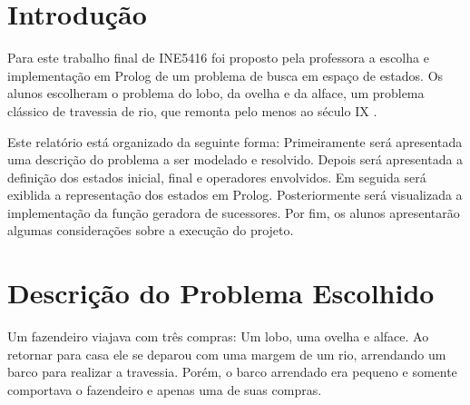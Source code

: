 \documentclass[brazil,times]{abnt}
\begin{document}





\data{\today}

\capa

\folhaderosto

\section*{Introdução}
	Para este trabalho final de INE5416 foi proposto pela professora a
	escolha e implementação em Prolog de um problema de busca em espaço de estados.
	Os alunos escolheram o problema do lobo, da ovelha e da alface, um problema
	clássico de travessia de rio, que remonta pelo menos ao século IX
	\cite{pressman:rivercrossing}.
	
	Este relatório está organizado da seguinte forma: Primeiramente será
	apresentada uma descrição do problema a ser modelado e resolvido. Depois será
	apresentada a definição dos estados inicial, final e operadores envolvidos. Em
	seguida será exiblida a representação dos estados em Prolog. Posteriormente
	será visualizada a implementação da função geradora de sucessores. Por fim, os
	alunos apresentarão algumas considerações sobre a execução do projeto.

\section*{Descrição do Problema Escolhido}
	Um fazendeiro viajava com três compras: Um lobo, uma ovelha e alface. Ao
	retornar para casa ele se deparou com uma margem de um rio, arrendando um barco
	para realizar a travessia. Porém, o barco arrendado era pequeno e somente
	comportava o fazendeiro e apenas uma de suas compras.
	
\end{document}
